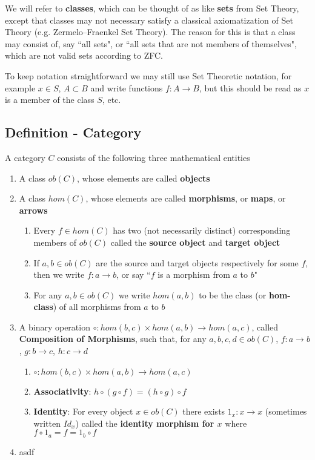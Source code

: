 \documentclass[9pt]{article} %
\begin{document}
We will refer to \textbf{classes}, which can be thought of as like \textbf{sets} from Set Theory, except that classes may not necessary satisfy a classical axiomatization of Set Theory (e.g. Zermelo–Fraenkel Set Theory).  The reason for this is that a class may consist of, say ``all sets", or ``all sets that are not members of themselves", which are not valid sets according to ZFC.

To keep notation straightforward we may still use Set Theoretic notation, for example $x \in S$, $A \subset B$ and write functions $f: A \rightarrow B$, but this should be read as $x$ is a member of the class $S$, etc.

\subsection{Definition - Category}

A category $C$ consists of the following three mathematical entities

\begin{enumerate}
    \item A class $ob(C)$, whose elements are called \textbf{objects}
    \item A class $hom(C)$, whose elements are called \textbf{morphisms}, or \textbf{maps}, or \textbf{arrows}
    \begin{enumerate}
        \item Every $f \in hom(C)$ has two (not necessarily distinct) corresponding members of $ob(C)$ called the \textbf{source object} and \textbf{target object}
        \item If $a, b \in ob(C)$ are the source and target objects respectively for some $f$, then we write $f: a \rightarrow b$, or say ``$f$ is a morphism from $a$ to $b$"
        \item For any $a, b \in ob(C)$ we write $hom(a, b)$ to be the class (or \textbf{hom-class}) of all morphisms from $a$ to $b$
    \end{enumerate}
    \item A binary operation $\circ: hom(b, c) \times hom(a, b) \rightarrow hom(a, c)$, called \textbf{Composition of Morphisms}, such that, for any $a, b, c, d \in ob(C)$, $f: a \rightarrow b$, $g: b \rightarrow c$, $h: c \rightarrow d$
    \begin{enumerate}
        \item $\circ: hom(b, c) \times hom(a, b) \rightarrow hom(a, c)$
        \item \textbf{Associativity}: $h \circ (g \circ f) = (h \circ g) \circ f$
        \item \textbf{Identity}: For every object $x \in ob(C)$ there exists $1_x: x \rightarrow x$ (sometimes written $Id_x$) called the \textbf{identity morphism for $x$} where $f \circ 1_a = f = 1_b \circ f$
    \end{enumerate}
    \item asdf
\end{enumerate}
\end{document}
